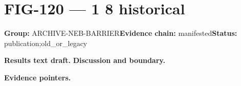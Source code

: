 \clearpage
\section{FIG-120 --- 1 8 historical}
\label{figpage:fig-120}
\textbf{Group:} ARCHIVE-NEB-BARRIER\quad \textbf{Evidence chain:} manifested\quad \textbf{Status:} publication;old\_or\_legacy

\textbf{Results text draft.} 
\textbf{Discussion and boundary.} 


\textbf{Evidence pointers.}



\vfill

